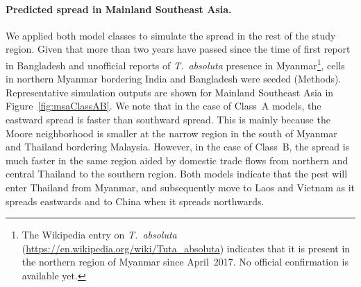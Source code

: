 \documentclass[11pt]{article}
\newcommand{\tuta}{\emph{T.~absoluta}}
\newcommand{\mooreRange}{r_\mathrm{M}}
\theoremstyle{definition}
\begin{document}
\paragraph{Predicted spread in Mainland Southeast Asia.}
We applied both model classes to simulate the spread in the rest of the
study region. Given that more than two years have passed since the time of
first report in Bangladesh and unofficial reports of \tuta{} presence in
Myanmar\footnote{The Wikipedia entry on \tuta{}
    (\url{https://en.wikipedia.org/wiki/Tuta_absoluta}) indicates
that it is present in the northern region of Myanmar since
April~2017. No official confirmation is available yet.}, cells in northern Myanmar bordering India and Bangladesh were
seeded (Methods). Representative simulation outputs are shown for Mainland
Southeast Asia in Figure~\ref{fig:msaClassAB}. We note that in the case of
Class~A models, the eastward spread is faster than southward spread. This
is mainly because the Moore neighborhood is smaller at the narrow region in
the south of Myanmar and Thailand bordering Malaysia. However, in
the case of Class~B, the spread is much faster in the same region aided by domestic
trade flows from northern and central Thailand to the southern region. Both models indicate that the pest will enter
Thailand from Myanmar, and subsequently move to Laos and Vietnam as it
spreads eastwards and to China when it spreads northwards.
\end{document}
